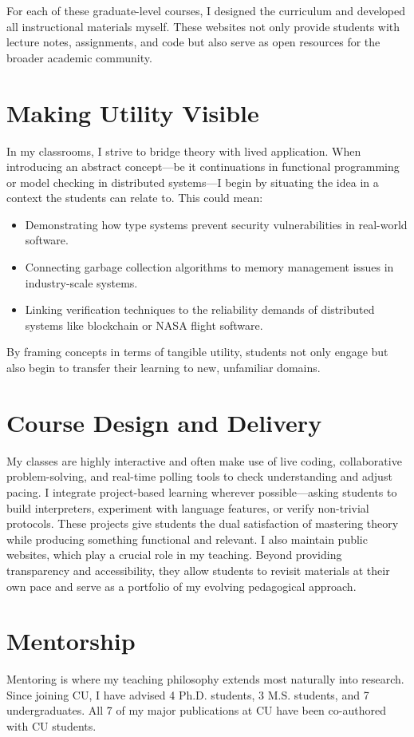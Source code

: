 For each of these graduate-level courses, I designed the curriculum and developed all instructional materials myself. These websites not only provide students with lecture notes, assignments, and code but also serve as open resources for the broader academic community.

\section*{Making Utility Visible}
In my classrooms, I strive to bridge theory with lived application. When introducing an abstract concept—be it continuations in functional programming or model checking in distributed systems—I begin by situating the idea in a context the students can relate to. This could mean:
\begin{itemize}
    \item Demonstrating how type systems prevent security vulnerabilities in real-world software.
    \item Connecting garbage collection algorithms to memory management issues in industry-scale systems.
    \item Linking verification techniques to the reliability demands of distributed systems like blockchain or NASA flight software.
\end{itemize}
By framing concepts in terms of tangible utility, students not only engage but also begin to transfer their learning to new, unfamiliar domains.

\section*{Course Design and Delivery}
My classes are highly interactive and often make use of live coding,
collaborative problem-solving, and real-time polling tools to check
understanding and adjust pacing. I integrate project-based learning
wherever possible—asking students to build interpreters, experiment with
language features, or verify non-trivial protocols. These projects give
students the dual satisfaction of mastering theory while producing
something functional and relevant. I also maintain public websites, which
play a crucial role in my teaching. Beyond providing transparency and
accessibility, they allow students to revisit materials at their own pace
and serve as a portfolio of my evolving pedagogical approach.

\section*{Mentorship}
Mentoring is where my teaching philosophy extends most naturally into research. Since joining CU, I have advised 4 Ph.D. students, 3 M.S. students, and 7 undergraduates. All 7 of my major publications at CU have been co-authored with CU students. 

